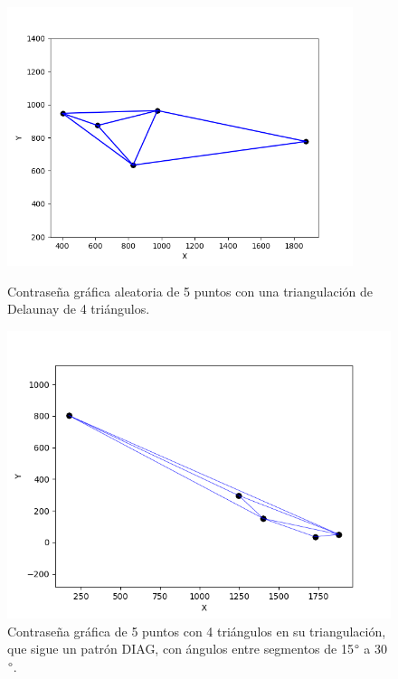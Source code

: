\documentclass[12pt]{report}
\begin{document}
	\begin{figure}[h]
	\centering
	\begin{minipage}[t]{0.45\textwidth}
		\centering
		\includegraphics[width=0.9\textwidth]{alea4td.png}
		\caption{Contraseña gráfica aleatoria de 5 puntos con una triangulación de Delaunay de 4 triángulos.}
		\label{4TD}
		
	\end{minipage}\hfill
	\begin{minipage}[t]{0.45\textwidth}
		\centering
		\includegraphics[width=0.9\linewidth]{4td30.png}  %
		\caption{Contraseña gráfica de 5 puntos con 4 triángulos en su triangulación, que sigue un patrón DIAG, con ángulos entre segmentos de 15$\degree$ a 30$\degree$.}
		\label{4td30}
	\end{minipage}
\end{figure}
\end{document}
